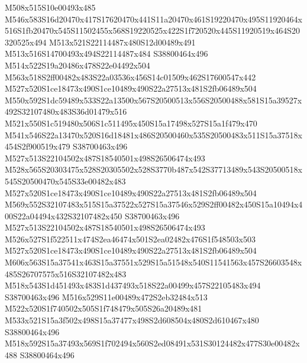 \documentclass{article}
\begin{document}
\begin{multicols}{2}





M508x515S10e00493x485 M546x583S16d20470x417S17620470x441S11a20470x461S19220470x495S11920464x516S1fb20470x545S11502455x568S19220525x422S1f720520x445S11920519x464S20320525x494 M513x521S22114487x480S12d00489x491 M513x516S14700493x494S22114487x484 S38800464x496 M514x522S19a20486x478S22e04492x504 M563x518S2ff00482x483S22a03536x456S14c01509x462S17600547x442 M527x520S1ce18473x490S1ce10489x490S22a27513x481S2fb06489x504 M550x592S1dc59489x533S22a13500x567S20500513x556S20500488x581S15a39527x492S32107480x483S36d01479x516 M521x550S1c519480x506S1c511495x450S15a17498x527S15a1f479x470 M541x546S22a13470x520S16d18481x486S20500460x535S20500483x511S15a37518x454S2f900519x479 S38700463x496 M527x513S22104502x487S18540501x498S26506474x493 M528x565S20303475x528S20305502x528S3770b487x542S37713489x543S20500518x545S20500470x545S33e00482x483 M527x520S1ce18473x490S1ce10489x490S22a27513x481S2fb06489x504 M569x552S32107483x515S15a37522x527S15a37546x529S2ff00482x450S15a10494x400S22a04494x432S32107482x450 S38700463x496 M527x513S22104502x487S18540501x498S26506474x493 M526x527S1f522511x474S2ea46474x501S2ea02482x476S1f548503x503 M527x520S1ce18473x490S1ce10489x490S22a27513x481S2fb06489x504 M606x563S15a37541x463S15a37551x529S15a51548x540S11541563x457S26603548x485S26707575x516S32107482x483 M518x543S1d451493x483S1d437493x518S22a00499x457S22105483x494 S38700463x496 M516x529S11e00489x472S2eb32484x513 M522x520S1f740502x505S1f748479x505S26a20489x481 M533x521S15a3f502x498S15a37477x498S2d608504x480S2d610467x480 S38800464x496 M518x592S15a37493x569S1f702494x560S2ed08491x531S30124482x477S30e00482x488 S38800464x496

\end{multicols}
\end{document}
